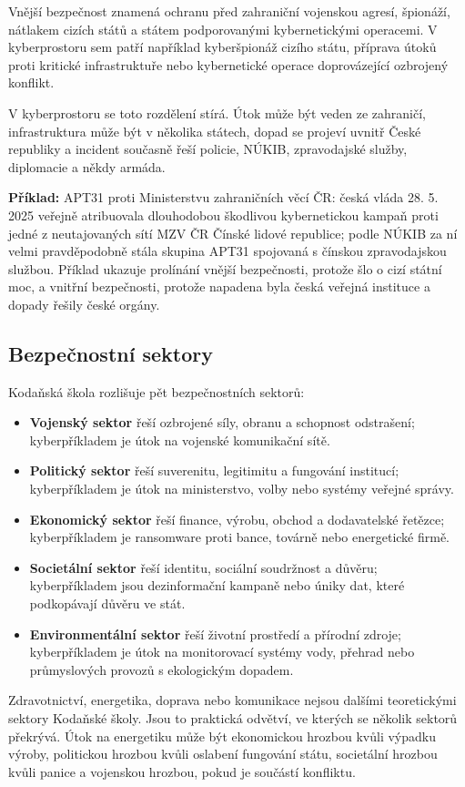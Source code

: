 \documentclass[11pt,a4paper]{article}
\newcommand{\priklad}[1]{\begin{tcolorbox}[breakable,enhanced,colback=green!7,colframe=green!30!black,boxrule=0pt,arc=1mm,left=5pt,right=5pt,top=5pt,bottom=5pt,before skip=6pt,after skip=6pt]\textbf{Příklad:} #1\end{tcolorbox}}
\begin{document}
Vnější bezpečnost znamená ochranu před zahraniční vojenskou agresí, špionáží, nátlakem cizích států a státem podporovanými kybernetickými operacemi. V kyberprostoru sem patří například kyberšpionáž cizího státu, příprava útoků proti kritické infrastruktuře nebo kybernetické operace doprovázející ozbrojený konflikt.

V kyberprostoru se toto rozdělení stírá. Útok může být veden ze zahraničí, infrastruktura může být v několika státech, dopad se projeví uvnitř České republiky a incident současně řeší policie, NÚKIB, zpravodajské služby, diplomacie a někdy armáda.

\priklad{APT31 proti Ministerstvu zahraničních věcí ČR: česká vláda 28. 5. 2025 veřejně atribuovala dlouhodobou škodlivou kybernetickou kampaň proti jedné z neutajovaných sítí MZV ČR Čínské lidové republice; podle NÚKIB za ní velmi pravděpodobně stála skupina APT31 spojovaná s čínskou zpravodajskou službou. Příklad ukazuje prolínání vnější bezpečnosti, protože šlo o cizí státní moc, a vnitřní bezpečnosti, protože napadena byla česká veřejná instituce a dopady řešily české orgány.}

\subsection*{Bezpečnostní sektory}
Kodaňská škola rozlišuje pět bezpečnostních sektorů:
\begin{itemize}
  \item \textbf{Vojenský sektor} řeší ozbrojené síly, obranu a schopnost odstrašení; kyberpříkladem je útok na vojenské komunikační sítě.
  \item \textbf{Politický sektor} řeší suverenitu, legitimitu a fungování institucí; kyberpříkladem je útok na ministerstvo, volby nebo systémy veřejné správy.
  \item \textbf{Ekonomický sektor} řeší finance, výrobu, obchod a dodavatelské řetězce; kyberpříkladem je ransomware proti bance, továrně nebo energetické firmě.
  \item \textbf{Societální sektor} řeší identitu, sociální soudržnost a důvěru; kyberpříkladem jsou dezinformační kampaně nebo úniky dat, které podkopávají důvěru ve stát.
  \item \textbf{Environmentální sektor} řeší životní prostředí a přírodní zdroje; kyberpříkladem je útok na monitorovací systémy vody, přehrad nebo průmyslových provozů s ekologickým dopadem.
\end{itemize}

Zdravotnictví, energetika, doprava nebo komunikace nejsou dalšími teoretickými sektory Kodaňské školy. Jsou to praktická odvětví, ve kterých se několik sektorů překrývá. Útok na energetiku může být ekonomickou hrozbou kvůli výpadku výroby, politickou hrozbou kvůli oslabení fungování státu, societální hrozbou kvůli panice a vojenskou hrozbou, pokud je součástí konfliktu.
\end{document}

